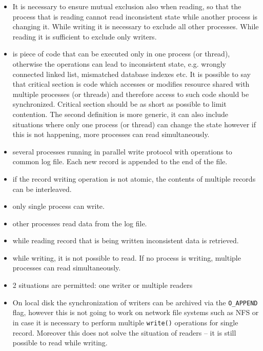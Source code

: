 \begin{itemize}
\item It is necessary to ensure mutual exclusion also when reading,
so that the process that is reading cannot read inconsistent state while
another process is changing it. While writing it is necessary to exclude
all other processes. While reading it is sufficient to exclude only writers.
\item {} is piece of code that can be executed
only in one process (or thread), otherwise the operations can lead to
inconsistent state, e.g. wrongly connected linked list, mismatched database
indexes etc. It is possible to say that critical section is code which accesses
or modifies resource shared with multiple processes (or threads) and therefore
access to such code should be synchronized. Critical section should be as
short as possible to limit contention. The second definition is more generic,
it can also include situations where only one process (or thread) can change
the state however if this is not happening, more processes can read
simultaneously.
\end{itemize}


\begin{slide}
\begin{itemize}
\item several processes running in parallel write protocol with operations
to common log file. Each new record is appended to the end of the file.
\item if the record writing operation is not atomic, the contents of multiple
records can be interleaved.
\item only single process can write.
\item other processes read data from the log file.
\item while reading record that is being written inconsistent data is retrieved.
\item while writing, it is not possible to read. If no process is writing,
multiple processes can read simultaneously.
\end{itemize}
\end{slide}

\begin{itemize}
\item 2 situations are permitted: one writer or multiple readers
\item On local disk the synchronization of writers can be archived via the
\texttt{O\_APPEND} flag, however this is not going to work on network file
systems such as NFS or in case it is necessary to perform multiple
\texttt{write()} operations for single record. Moreover this does not solve
the situation of readers -- it is still possible to read while writing.
\end{itemize}

